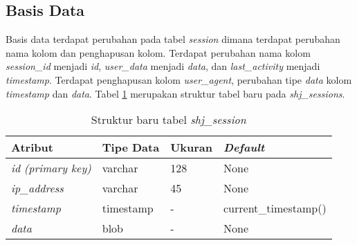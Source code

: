 \subsection{Basis Data}
Basis data terdapat perubahan pada tabel \textit{session} dimana terdapat perubahan nama kolom dan penghapusan kolom. Terdapat perubahan nama kolom \textit{session\_id} menjadi \textit{id}, \textit{user\_data} menjadi \textit{data}, dan \textit{last\_activity} menjadi \textit{timestamp}. Terdapat penghapusan kolom \textit{user\_agent}, perubahan tipe \textit{data} kolom \textit{timestamp} dan \textit{data}. Tabel \ref{tab:shjsessionbab5} merupakan struktur tabel baru pada \textit{shj\_sessions}.

\begin{table}[H]
\centering
\caption{Struktur baru tabel \textit{shj\_session}}
\label{tab:shjsessionbab5}
\begin{tabular}{|l|l|l|l|}
\hline
\textbf{Atribut}          & \textbf{Tipe Data} & \textbf{Ukuran} & \textit{\textbf{Default}} \\ \hline
\textit{id (primary key)} & varchar            & 128             & None                      \\ \hline
\textit{ip\_address}       & varchar            & 45              & None                      \\ \hline
\textit{timestamp}        & timestamp          & -               & current\_timestamp()       \\ \hline
\textit{data}             & blob               & -               & None                      \\ \hline
\end{tabular}
\end{table}

